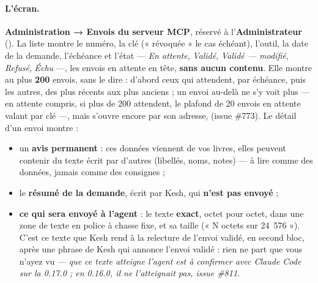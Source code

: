 \documentclass[a4paper,11pt,oneside]{article}
\begin{document}
\paragraph{L'écran.} \textbf{Administration → Envois du serveur MCP}, réservé à l'\textbf{Administrateur} (). La liste montre le numéro, la clé (« révoquée » le cas échéant), l'outil, la date de la demande, l'échéance et l'état --- \emph{En attente}, \emph{Validé}, \emph{Validé --- modifié}, \emph{Refusé}, \emph{Échu} ---, les envois en attente en tête, \textbf{sans aucun contenu}. Elle montre au plus \textbf{200} envois, sans le dire : d'abord ceux qui attendent, par échéance, puis les autres, des plus récents aux plus anciens ; un envoi au-delà ne s'y voit plus --- en attente compris, si plus de 200 attendent, le plafond de 20 envois en attente valant par clé ---, mais s'ouvre encore par son adresse,  (issue \#773). Le détail d'un envoi montre :
\begin{itemize}
    \item un \textbf{avis permanent} : ces données viennent de vos livres, elles peuvent contenir du texte écrit par d'autres (libellés, noms, notes) --- à lire comme des données, jamais comme des consignes ;
    \item le \textbf{résumé de la demande}, écrit par Kesh, qui \textbf{n'est pas envoyé} ;
    \item \textbf{ce qui sera envoyé à l'agent} : le texte \textbf{exact}, octet pour octet, dans une zone de texte en police à chasse fixe, et sa taille (« N octets sur 24~576 »). C'est ce texte que Kesh rend à la relecture de l'envoi validé, en second bloc, après une phrase de Kesh qui annonce l'envoi validé : rien ne part que vous n'ayez vu --- \emph{que ce texte atteigne l'agent est à confirmer avec Claude Code sur la 0.17.0 ; en 0.16.0, il ne l'atteignait pas, issue \#811}.
\end{itemize}
\end{document}
